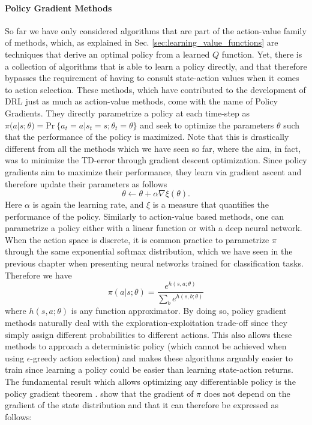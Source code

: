 \paragraph{\textbf{\uppercase{P}olicy \uppercase{G}radient \uppercase{M}ethods}} So far we have only considered algorithms that are part of the action-value family of methods, which, as explained in Sec. \ref{sec:learning_value_functions} are techniques that derive an optimal policy from a learned $Q$ function. Yet, there is a collection of algorithms that is able to learn a policy directly, and that therefore bypasses the requirement of having to consult state-action values when it comes to action selection. These methods, which have contributed to the development of DRL just as much as action-value methods, come with the name of Policy Gradients. They directly parametrize a policy at each time-step as $\pi(a|s;\theta)=\text{Pr}\:\{a_t = a| s_t=s;\theta_t=\theta\}$ and seek to optimize the parameters $\theta$ such that the performance of the policy is maximized. Note that this is drastically different from all the methods which we have seen so far, where the aim, in fact, was to minimize the TD-error through gradient descent optimization. Since policy gradients aim to maximize their performance, they learn via gradient ascent and therefore update their parameters as follows
\begin{equation}
	\theta \leftarrow \theta + \alpha \nabla \xi(\theta).
\end{equation}
Here $\alpha$ is again the learning rate, and $\xi$ is a measure that quantifies the performance of the policy. Similarly to action-value based methods, one can parametrize a policy either with a linear function or with a deep neural network. When the action space is discrete, it is common practice to parametrize $\pi$ through the same exponential softmax distribution, which we have seen in the previous chapter when presenting neural networks trained for classification tasks. Therefore we have
\begin{equation}
	\pi(a|s;\theta) = \frac{e^{h(s,a;\theta)}}{\sum_b e^{h(s,b;\theta)}}
\end{equation}
where $h(s,a;\theta)$ is any function approximator. By doing so, policy gradient methods naturally deal with the exploration-exploitation trade-off since they simply assign different probabilities to different actions. This also allows these methods to approach a deterministic policy (which cannot be achieved when using $\epsilon$-greedy action selection) and makes these algorithms arguably easier to train since learning a policy could be easier than learning state-action returns. The fundamental result which allows optimizing any differentiable policy is the policy gradient theorem \cite{sutton1999policy}. \citet{sutton1999policy} show that the gradient of $\pi$ does not depend on the gradient of the state distribution and that it can therefore be expressed as follows:
